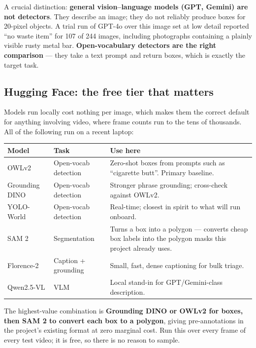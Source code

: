 \documentclass[11pt,a4paper]{article}
\begin{document}
A crucial distinction: \textbf{general vision--language models (GPT, Gemini) are
not detectors}. They describe an image; they do not reliably produce boxes for
20-pixel objects. A trial run of GPT-4o over this image set at low detail
reported ``no waste item'' for 107 of 244 images, including photographs
containing a plainly visible rusty metal bar. \textbf{Open-vocabulary detectors
are the right comparison} --- they take a text prompt and return boxes, which is
exactly the target task.

\subsection{Hugging Face: the free tier that matters}

Models run locally cost nothing per image, which makes them the correct default
for anything involving video, where frame counts run to the tens of thousands.
All of the following run on a recent laptop:

\begin{center}
\begin{tabular}{llp{6.1cm}}
\toprule
\textbf{Model} & \textbf{Task} & \textbf{Use here} \\
\midrule
OWLv2 & Open-vocab detection & Zero-shot boxes from prompts such as
``cigarette butt''. Primary baseline. \\
Grounding DINO & Open-vocab detection & Stronger phrase grounding; cross-check
against OWLv2. \\
YOLO-World & Open-vocab detection & Real-time; closest in spirit to what will
run onboard. \\
SAM 2 & Segmentation & Turns a box into a polygon --- converts cheap box labels
into the polygon masks this project already uses. \\
Florence-2 & Caption + grounding & Small, fast, dense captioning for
bulk triage. \\
Qwen2.5-VL & VLM & Local stand-in for GPT/Gemini-class description. \\
\bottomrule
\end{tabular}
\end{center}

\noindent The highest-value combination is \textbf{Grounding DINO or OWLv2 for
boxes, then SAM 2 to convert each box to a polygon}, giving pre-annotations in
the project's existing format at zero marginal cost. Run this over every frame
of every test video; it is free, so there is no reason to sample.
\end{document}
